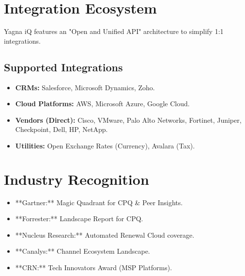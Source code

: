 \documentclass[12pt,a4paper]{article}
\begin{document}
\section{Integration Ecosystem}
Yagna iQ features an "Open and Unified API" architecture to simplify 1:1 integrations.

\subsection{Supported Integrations}
\begin{itemize}
    \item \textbf{CRMs:} Salesforce, Microsoft Dynamics, Zoho.
    \item \textbf{Cloud Platforms:} AWS, Microsoft Azure, Google Cloud.
    \item \textbf{Vendors (Direct):} Cisco, VMware, Palo Alto Networks, Fortinet, Juniper, Checkpoint, Dell, HP, NetApp.
    \item \textbf{Utilities:} Open Exchange Rates (Currency), Avalara (Tax).
\end{itemize}

\section{Industry Recognition}
\begin{itemize}
    \item **Gartner:** Magic Quadrant for CPQ & Peer Insights.
    \item **Forrester:** Landscape Report for CPQ.
    \item **Nucleus Research:** Automated Renewal Cloud coverage.
    \item **Canalys:** Channel Ecosystem Landscape.
    \item **CRN:** Tech Innovators Award (MSP Platforms).
\end{itemize}
\end{document}
